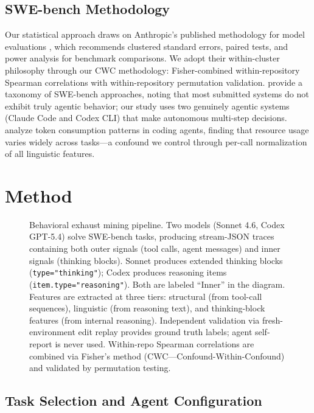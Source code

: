 \documentclass[11pt]{article}
\begin{document}
\subsection{SWE-bench Methodology}

Our statistical approach draws on Anthropic's published methodology for model evaluations \citep{anthropic2025evaluations}, which recommends clustered standard errors, paired tests, and power analysis for benchmark comparisons.
We adopt their within-cluster philosophy through our CWC methodology: Fisher-combined within-repository Spearman correlations with within-repository permutation validation.
\citet{martinez2025dissecting} provide a taxonomy of SWE-bench approaches, noting that most submitted systems do not exhibit truly agentic behavior; our study uses two genuinely agentic systems (Claude Code and Codex CLI) that make autonomous multi-step decisions.
\citet{bai2025token} analyze token consumption patterns in coding agents, finding that resource usage varies widely across tasks---a confound we control through per-call normalization of all linguistic features.


\section{Method}
\label{sec:method}

\begin{figure}[t]
\centering
\resizebox{\textwidth}{!}{}
\caption{Behavioral exhaust mining pipeline. Two models (Sonnet 4.6, Codex GPT-5.4) solve SWE-bench tasks, producing stream-JSON traces containing both outer signals (tool calls, agent messages) and inner signals (thinking blocks). Sonnet produces extended thinking blocks (\texttt{type="thinking"}); Codex produces reasoning items (\texttt{item.type="reasoning"}). Both are labeled ``Inner'' in the diagram. Features are extracted at three tiers: structural (from tool-call sequences), linguistic (from reasoning text), and thinking-block features (from internal reasoning). Independent validation via fresh-environment edit replay provides ground truth labels; agent self-report is never used. Within-repo Spearman correlations are combined via Fisher's method (CWC---Confound-Within-Confound) and validated by permutation testing.}
\label{fig:architecture}
\end{figure}

\subsection{Task Selection and Agent Configuration}
\end{document}
